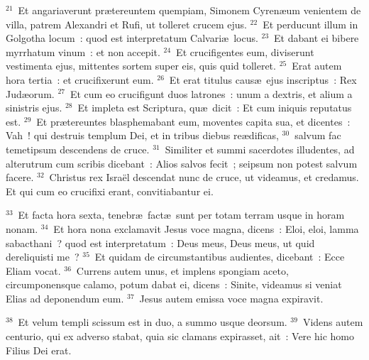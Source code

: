 ${}^{21}$~Et angariaverunt pr\ae tereuntem quempiam, Simonem Cyren\ae um venientem de villa, patrem Alexandri et Rufi, ut tolleret crucem ejus.
${}^{22}$~Et perducunt illum in Golgotha locum~: quod est interpretatum Calvari\ae\ locus.
${}^{23}$~Et dabant ei bibere myrrhatum vinum~: et non accepit.
${}^{24}$~Et crucifigentes eum, diviserunt vestimenta ejus, mittentes sortem super eis, quis quid tolleret.
${}^{25}$~Erat autem hora tertia~: et crucifixerunt eum.
${}^{26}$~Et erat titulus caus\ae\ ejus inscriptus~: Rex Jud\ae orum.
${}^{27}$~Et cum eo crucifigunt duos latrones~: unum a dextris, et alium a sinistris ejus.
${}^{28}$~Et impleta est Scriptura, qu\ae\ dicit~: Et cum iniquis reputatus est.
${}^{29}$~Et pr\ae tereuntes blasphemabant eum, moventes capita sua, et dicentes~: Vah~! qui destruis templum Dei, et in tribus diebus re\ae dificas,
${}^{30}$~salvum fac temetipsum descendens de cruce.
${}^{31}$~Similiter et summi sacerdotes illudentes, ad alterutrum cum scribis dicebant~: Alios salvos fecit~; seipsum non potest salvum facere.
${}^{32}$~Christus rex Isra\"el descendat nunc de cruce, ut videamus, et credamus. Et qui cum eo crucifixi erant, convitiabantur ei.


${}^{33}$~Et facta hora sexta, tenebr\ae\ fact\ae\ sunt per totam terram usque in horam nonam.
${}^{34}$~Et hora nona exclamavit Jesus voce magna, dicens~: Eloi, eloi, lamma sabacthani~? quod est interpretatum~: Deus meus, Deus meus, ut quid dereliquisti me~?
${}^{35}$~Et quidam de circumstantibus audientes, dicebant~: Ecce Eliam vocat.
${}^{36}$~Currens autem unus, et implens spongiam aceto, circumponensque calamo, potum dabat ei, dicens~: Sinite, videamus si veniat Elias ad deponendum eum.
${}^{37}$~Jesus autem emissa voce magna expiravit.


${}^{38}$~Et velum templi scissum est in duo, a summo usque deorsum.
${}^{39}$~Videns autem centurio, qui ex adverso stabat, quia sic clamans expirasset, ait~: Vere hic homo Filius Dei erat.


